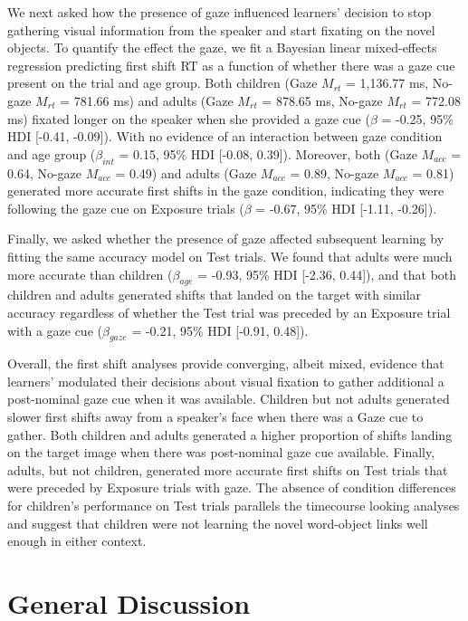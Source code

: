 \documentclass[man,floatsintext]{apa6}
\begin{document}
We next asked how the presence of gaze influenced learners' decision to
stop gathering visual information from the speaker and start fixating on
the novel objects. To quantify the effect the gaze, we fit a Bayesian
linear mixed-effects regression predicting first shift RT as a function
of whether there was a gaze cue present on the trial and age group. Both
children (Gaze \(M_{rt}\) = 1,136.77 ms, No-gaze \(M_{rt}\) = 781.66 ms)
and adults (Gaze \(M_{rt}\) = 878.65 ms, No-gaze \(M_{rt}\) = 772.08 ms)
fixated longer on the speaker when she provided a gaze cue (\(\beta\) =
-0.25, 95\% HDI {[}-0.41, -0.09{]}). With no evidence of an interaction
between gaze condition and age group (\(\beta_{int}\) = 0.15, 95\% HDI
{[}-0.08, 0.39{]}). Moreover, both (Gaze \(M_{acc}\) = 0.64, No-gaze
\(M_{acc}\) = 0.49) and adults (Gaze \(M_{acc}\) = 0.89, No-gaze
\(M_{acc}\) = 0.81) generated more accurate first shifts in the gaze
condition, indicating they were following the gaze cue on Exposure
trials (\(\beta\) = -0.67, 95\% HDI {[}-1.11, -0.26{]}).

Finally, we asked whether the presence of gaze affected subsequent
learning by fitting the same accuracy model on Test trials. We found
that adults were much more accurate than children (\(\beta_{age}\) =
-0.93, 95\% HDI {[}-2.36, 0.44{]}), and that both children and adults
generated shifts that landed on the target with similar accuracy
regardless of whether the Test trial was preceded by an Exposure trial
with a gaze cue (\(\beta_{gaze}\) = -0.21, 95\% HDI {[}-0.91, 0.48{]}).

Overall, the first shift analyses provide converging, albeit mixed,
evidence that learners' modulated their decisions about visual fixation
to gather additional a post-nominal gaze cue when it was available.
Children but not adults generated slower first shifts away from a
speaker's face when there was a Gaze cue to gather. Both children and
adults generated a higher proportion of shifts landing on the target
image when there was post-nominal gaze cue available. Finally, adults,
but not children, generated more accurate first shifts on Test trials
that were preceded by Exposure trials with gaze. The absence of
condition differences for children's performance on Test trials
parallels the timecourse looking analyses and suggest that children were
not learning the novel word-object links well enough in either context.

\section{General Discussion}\label{general-discussion}
\end{document}
